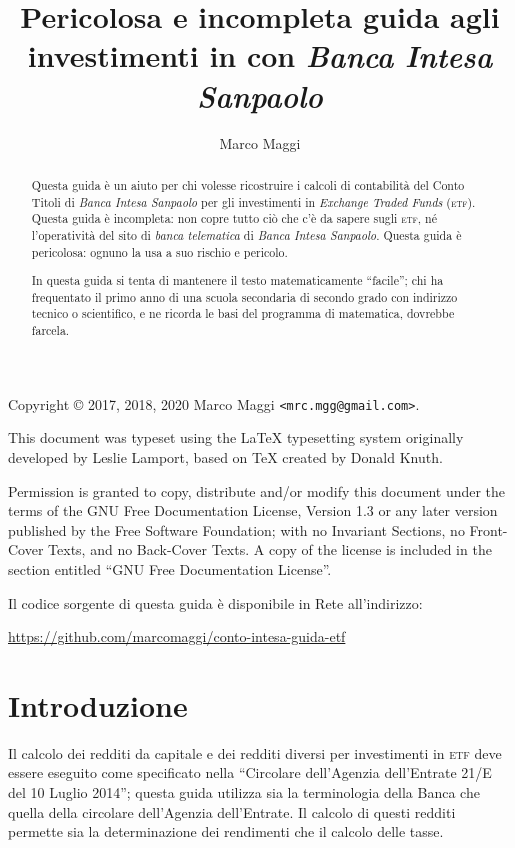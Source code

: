 \documentclass[12pt,a4paper]{article}
\author{Marco Maggi}
\title{Pericolosa e incompleta guida agli investimenti in \Etf{} con \emph{Banca Intesa Sanpaolo}}
\newcommand{\Parentesi}[1]{(#1)}
\newcommand{\Etf}[1]{\textsc{etf}}
\begin{document}
\maketitle

\begin{abstract}
  \noindent
  Questa guida è un  aiuto per chi volesse ricostruire i calcoli di  contabilità del Conto Titoli di
  \emph{Banca   Intesa   Sanpaolo}   per   gli  investimenti   in   \emph{Exchange   Traded   Funds}
  \Parentesi{\Etf{}}.   Questa guida  è incompleta:  non copre  tutto ciò  che c'è  da sapere  sugli
  \Etf{}, né  l'operatività del  sito di  \emph{banca telematica}  di \emph{Banca  Intesa Sanpaolo}.
  Questa guida è pericolosa: ognuno la usa a suo rischio e pericolo.

  In questa guida si  tenta di mantenere il testo matematicamente ``facile'';  chi ha frequentato il
  primo anno  di una scuola secondaria  di secondo grado con  indirizzo tecnico o scientifico,  e ne
  ricorda le basi del programma di matematica, dovrebbe farcela.
\end{abstract}

\tableofcontents

\newpage{}

\noindent
Copyright \copyright{} 2017, 2018, 2020 Marco Maggi \texttt{<mrc.mgg@gmail.com>}.

This  document was  typeset using  the \LaTeX{}  typesetting system  originally developed  by Leslie
Lamport, based on \TeX{} created by Donald Knuth.

Permission is  granted to copy, distribute  and/or modify this document  under the terms of  the GNU
Free  Documentation License,  Version  1.3 or  any  later  version published  by  the Free  Software
Foundation; with no  Invariant Sections, no Front-Cover  Texts, and no Back-Cover Texts.   A copy of
the license is included in the section entitled ``GNU Free Documentation License''.

Il codice sorgente di questa guida è disponibile in Rete all'indirizzo:
\begin{center}
  \url{https://github.com/marcomaggi/conto-intesa-guida-etf}
\end{center}

\newpage{}

\section{Introduzione}


Il calcolo  dei redditi da  capitale e dei  redditi diversi per  investimenti in \Etf{}  deve essere
eseguito come  specificato nella ``Circolare  dell'Agenzia dell'Entrate  21/E del 10  Luglio 2014'';
questa  guida utilizza  sia la  terminologia  della Banca  che quella  della circolare  dell'Agenzia
dell'Entrate.  Il  calcolo di questi  redditi permette sia la  determinazione dei rendimenti  che il
calcolo delle tasse.
\end{document}
